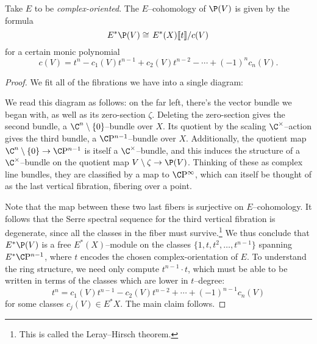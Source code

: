 \begin{theorem}\label{CohomologyOfProjectivization}
Take $E$ to be \emph{complex-oriented}.  The $E$--cohomology of $\P(V)$ is given by the formula \[E^* \P(V) \cong \left. E^*(X) \llbracket t \rrbracket \middle/ c(V) \right.\] for a certain monic polynomial \[c(V) = t^n - c_1(V) t^{n-1} + c_2(V) t^{n-2} - \cdots + (-1)^n c_n(V).\]
\end{theorem}
\begin{proof}
We fit all of the fibrations we have into a single diagram:
\begin{center}
\end{center}
We read this diagram as follows: on the far left, there's the vector bundle we began with, as well as its zero-section $\zeta$.  Deleting the zero-section gives the second bundle, a $\C^n \setminus \{0\}$--bundle over $X$.  Its quotient by the scaling $\C^\times$--action gives the third bundle, a $\CP^{n-1}$--bundle over $X$.  Additionally, the quotient map $\C^n \setminus \{0\} \to \CP^{n-1}$ is itself a $\C^\times$--bundle, and this induces the structure of a $\C^\times$--bundle on the quotient map $V \setminus \zeta \to \P(V)$.  Thinking of these as complex line bundles, they are classified by a map to $\CP^\infty$, which can itself be thought of as the last vertical fibration, fibering over a point.

Note that the map between these two last fibers is surjective on $E$--cohomology.  It follows that the Serre spectral sequence for the third vertical fibration is degenerate, since all the classes in the fiber must survive.\footnote{This is called the Leray--Hirsch theorem.}  We thus conclude that $E^* \P(V)$ is a free $E^*(X)$--module on the classes $\{1, t, t^2, \ldots, t^{n-1}\}$ spanning $E^* \CP^{n-1}$, where $t$ encodes the chosen complex-orientation of $E$.  To understand the ring structure, we need only compute $t^{n-1} \cdot t$, which must be able to be written in terms of the classes which are lower in $t$--degree: \[t^n = c_1(V) t^{n-1} - c_2(V) t^{n-2} + \cdots + (-1)^{n-1} c_n(V)\] for some classes $c_j(V) \in E^* X$.  The main claim follows.
\end{proof}

